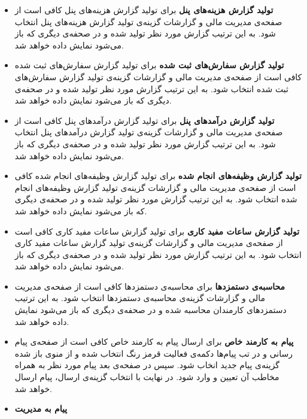 \begin{itemize}
\item \textbf{تولید گزارش هزینه‌های پنل} \newline
برای تولید گزارش هزینه‌های پنل کافی است از صفحه‌ی مدیریت مالی و گزارشات گزینه‌ی تولید گزارش هزینه‌های پنل انتخاب شود. به این ترتیب گزارش مورد نظر تولید شده و در صحفه‌ی دیگری که باز می‌شود نمایش داده خواهد شد.
\item \textbf{تولید گزارش سفارش‌های ثبت شده} \newline
برای تولید گزارش سفارش‌های ثبت شده کافی است از صفحه‌ی مدیریت مالی و گزارشات گزینه‌ی تولید گزارش سفارش‌های ثبت شده انتخاب شود. به این ترتیب گزارش مورد نظر تولید شده و در صحفه‌ی دیگری که باز می‌شود نمایش داده خواهد شد.
\item \textbf{تولید گزارش درآمد‌های پنل} \newline
برای تولید گزارش درآمد‌های پنل کافی است از صفحه‌ی مدیریت مالی و گزارشات گزینه‌ی تولید گزارش درآمد‌های پنل انتخاب شود. به این ترتیب گزارش مورد نظر تولید شده و در صحفه‌ی دیگری که باز می‌شود نمایش داده خواهد شد.
\item \textbf{تولید گزارش وظیفه‌های انجام شده} \newline
برای تولید گزارش وظیفه‌های انجام شده کافی است از صفحه‌ی مدیریت مالی و گزارشات گزینه‌ی تولید گزارش وظیفه‌های انجام شده انتخاب شود. به این ترتیب گزارش مورد نظر تولید شده و در صحفه‌ی دیگری که باز می‌شود نمایش داده خواهد شد.
\item \textbf{تولید گزارش ساعات مفید کاری} \newline
برای تولید گزارش ساعات مفید کاری کافی است از صفحه‌ی مدیریت مالی و گزارشات گزینه‌ی تولید گزارش ساعات مفید کاری انتخاب شود. به این ترتیب گزارش مورد نظر تولید شده و در صحفه‌ی دیگری که باز می‌شود نمایش داده خواهد شد.
\item \textbf{محاسبه‌ی دستمزد‌ها} \newline
برای محاسبه‌ی دستمزد‌ها کافی است از صفحه‌ی مدیریت مالی و گزارشات گزینه‌ی محاسبه‌ی دستمزد‌ها انتخاب شود. به این ترتیب دستمزد‌های کارمندان محاسبه شده و در صحفه‌ی دیگری که باز می‌شود نمایش داده خواهد شد.
\item \textbf{پیام به کارمند خاص} \newline
برای ارسال پیام به کارمند خاص کافی است از صفحه‌ی پیام رسانی و در تب پیام‌ها دکمه‌ی فعالیت قرمز رنگ انتخاب شده و از منوی باز شده گزینه‌ی پیام جدید انخاب شود. سپس در صفحه‌ی بعد پیام مورد نظر به همراه مخاطب آن تعیین و وارد شود. در نهایت با انتخاب گزینه‌ی ارسال، پیام ارسال خواهد شد.
\item \textbf{پیام به مدیریت} \newline


\end{itemize}

